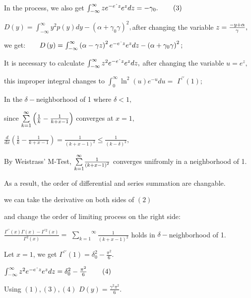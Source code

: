 \documentclass{article}
\begin{document}

In the process, we also get $\int_{-\infty }^{\infty }ze^{-e\symbol{94}%
z}e^{z}dz=-\gamma _{0}.\qquad \left( 3\right) $

$D\left( y\right) =\int_{-\infty }^{\infty }y^{2}p(y)dy-\left( \alpha
+\gamma _{0}\gamma \right) ^{2},$after changing the variable $z=\frac{%
-y+\alpha }{\gamma },$

we get:$\qquad D\left( y\right) =\int_{-\infty }^{\infty }\left( \alpha
-\gamma z\right) ^{2}e^{-e\symbol{94}z}e^{z}dz-\left( \alpha +\gamma
_{0}\gamma \right) ^{2};$

It is necessary to calculate $\int_{-\infty }^{\infty }z^{2}e^{-e\symbol{94}%
z}e^{z}dz,$ after changing the variable $u=e^{z},$

this improper integral changes to $\int_{0}^{\infty }\ln ^{2}\left( u\right)
e^{-u}du=$ $\Gamma ^{\prime \prime }\left( 1\right) ;$

In the $\delta -$neighborhood of 1 where $\delta <1,$

since $\overset{\infty }{\underset{k=1}{\sum }}\left( \frac{1}{k}-\frac{1}{%
k+x-1}\right) $ converges at $x=1,$

$\frac{d}{dx}\left( \frac{1}{k}-\frac{1}{k+x-1}\right) =\frac{1}{\left(
k+x-1\right) ^{2}}\leq \frac{1}{\left( k-\delta \right) ^{2}},$

By Weistrass' M-Test, $\overset{\infty }{\underset{k=1}{\sum }}\frac{1}{%
\left( k+x-1\right) ^{2}}$ converges unifromly in a neighborhood of 1.

As a result, the order of differential and series summation are changable.

we can take the derivative on both sides of $\left( 2\right) $

and change the order of limiting process on the right side:

$\frac{\Gamma ^{\prime \prime }\left( x\right) \Gamma \left( x\right)
-\Gamma ^{\prime 2}\left( x\right) }{\Gamma ^{2}\left( x\right) }=$ $\overset%
{\infty }{\underset{k=1}{\sum }}\frac{1}{\left( k+x-1\right) ^{2}}$ holds in 
$\delta -$neighborhood of 1.

Let $x=1$, we get $\Gamma ^{\prime \prime }\left( 1\right) =\delta _{0}^{2}-%
\frac{\pi ^{2}}{6}.$

$\int_{-\infty }^{\infty }z^{2}e^{-e\symbol{94}z}e^{z}dz=\delta _{0}^{2}-%
\frac{\pi ^{2}}{6}\qquad \left( 4\right) $

Using $\left( 1\right) ,\left( 3\right) ,\left( 4\right) $ $D\left( y\right)
=\frac{\gamma ^{2}\pi ^{2}}{6}.$
\end{document}
